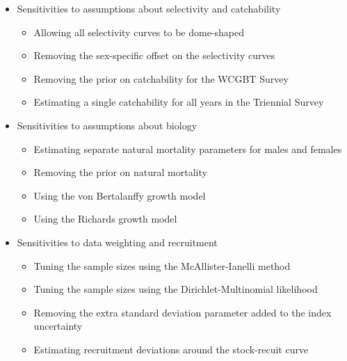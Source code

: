 \documentclass[12pt,]{article}
\begin{document}
\begin{itemize}

  \item Sensitivities to assumptions about selectivity and catchability

  \begin{itemize}

        \item Allowing all selectivity curves to be dome-shaped

        \item Removing the sex-specific offset on the selectivity curves
  
        \item Removing the prior on catchability for the WCGBT Survey

        \item Estimating a single catchability for all years in the Triennial Survey

  \end{itemize}

  \item Sensitivities to assumptions about biology
  
  \begin{itemize}

    \item Estimating separate natural mortality parameters for males and females
    
    \item Removing the prior on natural mortality
    
    \item Using the von Bertalanffy growth model
    
    \item Using the Richards growth model

  \end{itemize}

  \item Sensitivities to data weighting and recruitment

  \begin{itemize}

        \item Tuning the sample sizes using the McAllister-Ianelli method

        \item Tuning the sample sizes using the Dirichlet-Multinomial likelihood

        \item Removing the extra standard deviation parameter added to the index uncertainty
        \item Estimating recruitment deviations around the stock-recuit curve


\end{itemize}
\end{itemize}
\end{document}
